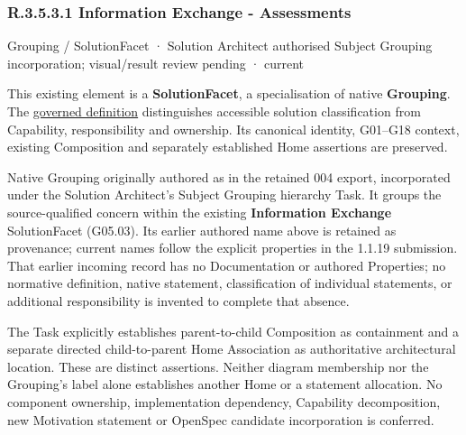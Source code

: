 \subsubsection*{R.3.5.3.1 Information Exchange - Assessments}
\label{navigation:R.3.5.3.1}

\label{element:0085c4fe23cf4b76829fae3369c9fbb1}
{\small Grouping / SolutionFacet · Solution Architect authorised Subject Grouping incorporation; visual/result review pending · current}\par

This existing element is a \textbf{SolutionFacet}, a specialisation of native
\textbf{Grouping}. The \href{\detokenize{../../../../../../../governance/continuum-representation.md#solutionfacet-classification--1119-candidate}}{governed definition}
distinguishes accessible solution classification from Capability, responsibility
and ownership. Its canonical identity, G01–G18 context, existing Composition
and separately established Home assertions are preserved.



Native Grouping originally authored as \texttt{} in the retained 004 export,
incorporated under the Solution Architect's Subject Grouping hierarchy Task.
It groups the source-qualified \texttt{} concern within
the existing \textbf{Information Exchange} SolutionFacet (G05.03). Its earlier authored name above is retained as provenance; current names
follow the explicit properties in the 1.1.19 submission.
That earlier incoming record has no Documentation or authored Properties; no normative
definition, native statement, classification of individual statements, or
additional responsibility is invented to complete that absence.



The Task explicitly establishes parent-to-child Composition as containment and
a separate directed child-to-parent Home Association as authoritative architectural
location. These are distinct assertions. Neither diagram membership nor the
Grouping's label alone establishes another Home or a statement allocation.
No component ownership, implementation dependency, Capability decomposition,
new Motivation statement or OpenSpec candidate incorporation is conferred.



